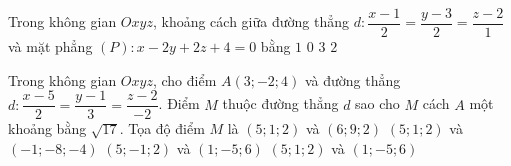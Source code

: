 \begin{ex}%
	Trong không gian $Oxyz$, khoảng cách giữa đường thẳng $d\colon \dfrac{x-1}{2}=\dfrac{y-3}{2}=\dfrac{z-2}{1}$ và mặt phẳng $(P)\colon x-2y+2z+4=0$ bằng
	\choice
	{\True $1$}
	{$0$}
	{$3$}
	{$2$}
\end{ex}
\begin{ex}%
	Trong không gian $Oxyz$, cho điểm $A(3;-2;4)$ và đường thẳng $d\colon \dfrac{x-5}{2}=\dfrac{y-1}{3}=\dfrac{z-2}{-2}$. Điểm $M$ thuộc đường thẳng $d$ sao cho $M$ cách $A$ một khoảng bằng $\sqrt{17}$. Tọa độ điểm $M$ là
	\choice
	{$(5;1;2)$ và $(6;9;2)$}
	{$(5;1;2)$ và $(-1;-8;-4)$}
	{$(5;-1;2)$ và $(1;-5;6)$}
	{\True $(5;1;2)$ và $(1;-5;6)$}
\end{ex}
